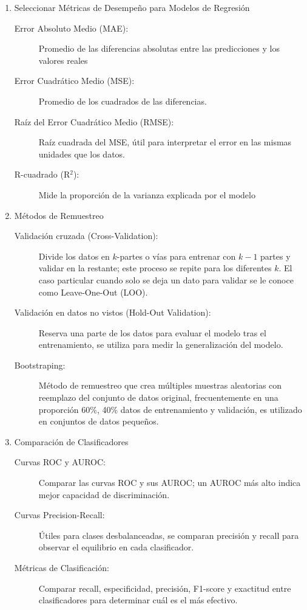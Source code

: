 \documentclass[12pt,letterpaper,spanish, twoside]{article}
\begin{document}
\begin{enumerate}
    \item Seleccionar Métricas de Desempeño para Modelos de Regresión
    \begin{description}
        \item[Error Absoluto Medio (MAE):] Promedio de las diferencias absolutas entre las predicciones y los valores reales
        \item[Error Cuadrático Medio (MSE):] Promedio de los cuadrados de las diferencias.
        \item[Raíz del Error Cuadrático Medio (RMSE):] Raíz cuadrada del MSE, útil para interpretar el error en las mismas unidades que los datos.
        \item[R-cuadrado (R$^2$):] Mide la proporción de la varianza explicada por el modelo
    \end{description}

    \item Métodos de Remuestreo
    \begin{description}
        \item[Validación cruzada (Cross-Validation):] Divide los datos en $k$-partes o vías para entrenar con $k-1$ partes y validar en la restante; este proceso se repite para los diferentes $k$. El caso particular cuando solo se deja un dato para validar se le conoce como Leave-One-Out (LOO).
        \item[Validación en datos no vistos (Hold-Out Validation):] Reserva una parte de los datos para evaluar el modelo tras el entrenamiento, se utiliza para medir la generalización del modelo.
        \item[Bootstraping:] Método de remuestreo que crea múltiples muestras aleatorias con reemplazo del conjunto de datos original, frecuentemente en una proporción 60\%, 40\% datos de entrenamiento y validación, es utilizado en conjuntos de datos pequeños.
    \end{description}

    \item Comparación de Clasificadores
    \begin{description}
        \item[Curvas ROC y AUROC:] Comparar las curvas ROC y sus AUROC; un AUROC más alto indica mejor capacidad de discriminación.
        \item[Curvas Precision-Recall:] Útiles para clases desbalanceadas, se comparan precisión y recall para observar el equilibrio en cada clasificador.
        \item[Métricas de Clasificación:] Comparar recall, especificidad, precisión, F1-score y exactitud entre clasificadores para determinar cuál es el más efectivo.
    \end{description}


\end{enumerate}
\end{document}
